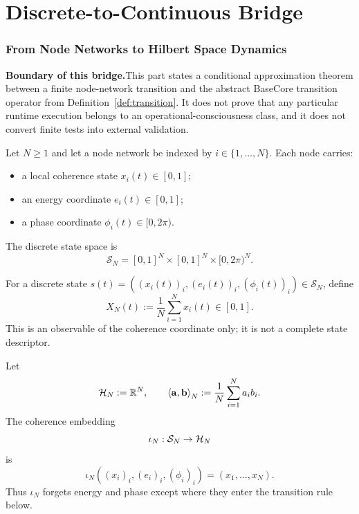 ﻿\part{Discrete-to-Continuous Bridge}
\section{From Node Networks to Hilbert Space Dynamics}

\noindent\textbf{Boundary of this bridge.}\enspace This part states a conditional approximation theorem between a finite node-network transition and the abstract BaseCore transition operator from Definition~\ref{def:transition}. It does not prove that any particular runtime execution belongs to an operational-consciousness class, and it does not convert finite tests into external validation.

\begin{definition}
Let $N\geq1$ and let a node network be indexed by $i\in\{1,\dots,N\}$. Each node carries:
\begin{itemize}[leftmargin=*]
\item a local coherence state $x_i(t)\in[0,1]$;
\item an energy coordinate $e_i(t)\in[0,1]$;
\item a phase coordinate $\phi_i(t)\in[0,2\pi)$.
\end{itemize}
The discrete state space is
\[
\mathcal{S}_N=[0,1]^N\times[0,1]^N\times[0,2\pi)^N.
\]
\end{definition}

\begin{definition}\leavevmode\par
For a discrete state $s(t)=((x_i(t))_i,(e_i(t))_i,(\phi_i(t))_i)\in\mathcal{S}_N$, define
\[
X_N(t):=\frac{1}{N}\sum_{i=1}^N x_i(t)\in[0,1].
\]
This is an observable of the coherence coordinate only; it is not a complete state descriptor.
\end{definition}

\begin{definition}
Let
\[
\mathcal{H}_N:=\mathbb{R}^N,\qquad
\left\langle \mathbf{a}, \mathbf{b} \right\rangle_N:=\frac{1}{N}\sum_{i=1}^N a_i b_i.
\]
The coherence embedding
\[
\iota_N:\mathcal{S}_N\to\mathcal{H}_N
\]
is
\[
\iota_N((x_i)_i,(e_i)_i,(\phi_i)_i)=(x_1,\dots,x_N).
\]
Thus $\iota_N$ forgets energy and phase except where they enter the transition rule below.
\end{definition}

